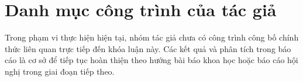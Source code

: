 \chapter*{Danh mục công trình của tác giả}
\label{Appendix1}

Trong phạm vi thực hiện hiện tại, nhóm tác giả chưa có công trình công bố chính thức liên quan trực tiếp đến khóa luận này. Các kết quả và phân tích trong báo cáo là cơ sở để tiếp tục hoàn thiện theo hướng bài báo khoa học hoặc báo cáo hội nghị trong giai đoạn tiếp theo.
